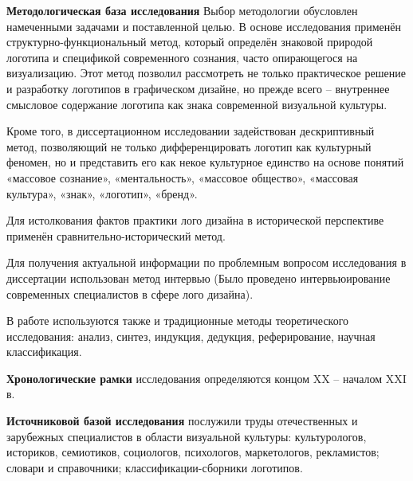 \textbf{Методологическая база исследования}
Выбор методологии обусловлен намеченными задачами и поставленной целью. В основе исследования применён структурно-функциональный метод, который определён знаковой природой логотипа и спецификой современного сознания, часто опирающегося на визуализацию. Этот метод позволил рассмотреть не только практическое решение и разработку логотипов в графическом дизайне, но прежде всего – внутреннее смысловое содержание логотипа как знака современной визуальной культуры.

Кроме того, в диссертационном исследовании задействован дескриптивный метод, позволяющий не только дифференцировать логотип как культурный феномен, но и представить его как некое культурное единство на основе понятий «массовое сознание», «ментальность», «массовое общество», «массовая культура», «знак», «логотип», «бренд».

Для истолкования фактов практики лого дизайна в исторической перспективе применён сравнительно-исторический метод.

Для получения актуальной информации по проблемным вопросом исследования в диссертации использован метод интервью (Было проведено интервьюирование современных специалистов в сфере лого дизайна).

В работе используются также и традиционные методы теоретического исследования: анализ, синтез, индукция, дедукция, реферирование, научная классификация.

\textbf{Хронологические рамки} исследования определяются концом XX – началом XXI в.

\textbf{Источниковой базой исследования} послужили труды отечественных и зарубежных специалистов в области визуальной культуры: культурологов, историков, семиотиков, социологов, психологов, маркетологов, рекламистов; словари и справочники; классификации-сборники логотипов.

